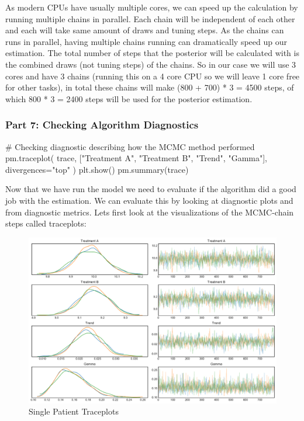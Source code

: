 \documentclass[12pt,a4paper,leqno]{report}
\theoremstyle{plain}
\theoremstyle{definition}
\theoremstyle{remark}
\begin{document}
As modern CPUs have usually multiple cores, we can speed up the calculation by running
multiple chains in parallel. Each chain will be independent of each other and each will
take same amount of draws and tuning steps. As the chains can runs in parallel, having
multiple chains running can dramatically speed up our estimation. The total number of steps that
the posterior will be calculated with is the combined draws (not tuning steps) of the
chains. So in our case we will use 3 cores and have 3 chains (running this on a 4 core
CPU so we will leave 1 core free for other tasks), in total these chains will make (800 +
700) * 3 = 4500 steps, of which 800 * 3 = 2400 steps will be used for the posterior estimation.

\subsubsection*{Part 7: Checking Algorithm Diagnostics}

\bigskip
\begin{pyverbatim}[][fontsize=\footnotesize]
# Checking diagnostic describing how the MCMC method performed
pm.traceplot(
        trace, ["Treatment A", "Treatment B", "Trend", "Gamma"], divergences="top"
    )
plt.show()
pm.summary(trace)
\end{pyverbatim}
\bigskip

Now that we have run the model we need to evaluate if the algorithm did a good job with
the estimation. We can evaluate this by looking at diagnostic plots and from diagnostic
metrics. Lets first look at the visualizations of the MCMC-chain steps called traceplots:

\begin{figure}[H]
    \caption{Single Patient Traceplots}\label{traceplots}
    \includegraphics[width=\textwidth,height=\textheight,keepaspectratio]{single_patient_traceplot.pdf}
\end{figure}
\end{document}
